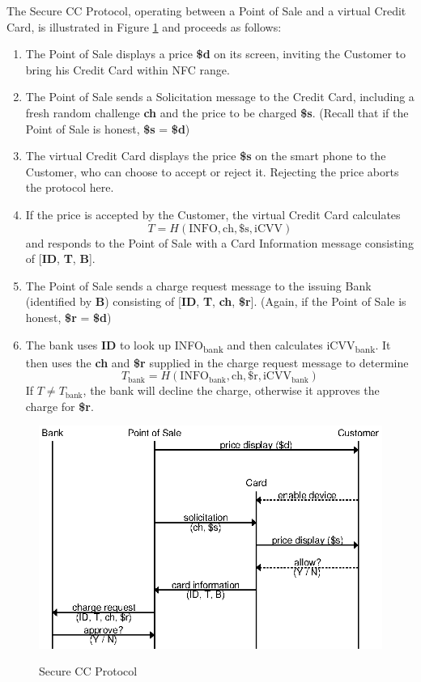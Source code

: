 The Secure CC Protocol, operating between a Point of Sale and a virtual Credit Card, is illustrated in Figure \ref{fig:secure-ccp} and proceeds as follows:

\begin{enumerate}
\item The Point of Sale displays a price \textbf{\$d} on its screen, inviting the Customer to bring his Credit Card within NFC range.
\item The Point of Sale sends a Solicitation message to the Credit Card, including a fresh random challenge \textbf{ch} and the price to be charged \textbf{\$s}.
	(Recall that if the Point of Sale is honest, \textbf{\$s} = \textbf{\$d})
\item The virtual Credit Card displays the price \textbf{\$s} on the smart phone to the Customer, who can choose to accept or reject it.
	Rejecting the price aborts the protocol here.
\item If the price is accepted by the Customer, the virtual Credit Card calculates
	$$T = H(\text{INFO}, \text{ch}, \text{\$s}, \text{iCVV})$$
	and responds to the Point of Sale with a Card Information message consisting of [\textbf{ID}, \textbf{T}, \textbf{B}].
\item The Point of Sale sends a charge request message to the issuing Bank (identified by \textbf{B}) consisting of [\textbf{ID}, \textbf{T}, \textbf{ch}, \textbf{\$r}].
	(Again, if the Point of Sale is honest, \textbf{\$r} = \textbf{\$d})
\item The bank uses \textbf{ID} to look up INFO\textsubscript{bank} and then calculates iCVV\textsubscript{bank}.
	It then uses the \textbf{ch} and \textbf{\$r} supplied in the charge request message to determine
	$$T_{\text{bank}} = H(\text{INFO}_{\text{bank}}, \text{ch}, \text{\$r}, \text{iCVV}_{\text{bank}})$$
	If $T \neq T_{\text{bank}}$, the bank will decline the charge, otherwise it approves the charge for \textbf{\$r}.
\end{enumerate}

\begin{figure}
  \caption{Secure CC Protocol}
  \centering
    \includegraphics{img/secure_ccp.eps}
  \label{fig:secure-ccp}
\end{figure}

